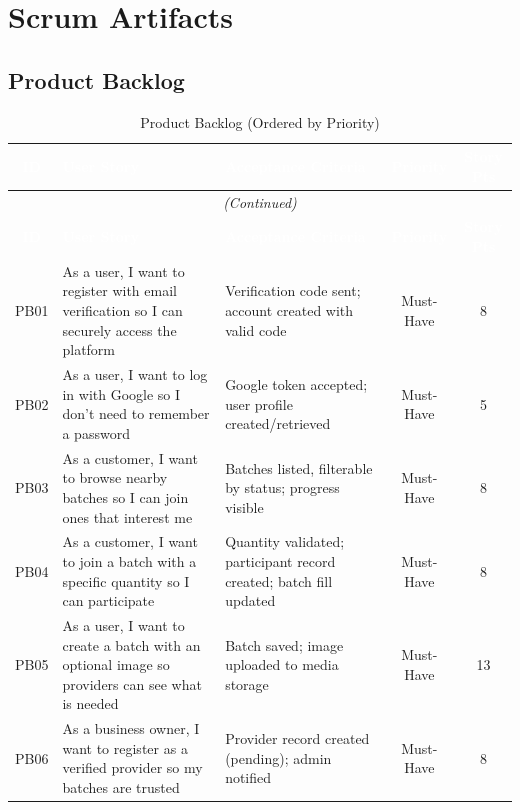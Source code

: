 \documentclass[12pt, a4paper]{report}
\begin{document}
\section{Scrum Artifacts}

\subsection{Product Backlog}

\begin{longtable}{c p{4cm} p{5.5cm} c c}
\caption{Product Backlog (Ordered by Priority)}\label{tab:product-backlog}\\
\toprule
\rowcolor{tablehead}
\textcolor{white}{\textbf{ID}} &
\textcolor{white}{\textbf{User Story}} &
\textcolor{white}{\textbf{Acceptance Criteria}} &
\textcolor{white}{\textbf{Priority}} &
\textcolor{white}{\textbf{Story Pts}}\\
\midrule
\endfirsthead
\multicolumn{5}{c}{\small\itshape (Continued)}\\
\toprule
\rowcolor{tablehead}
\textcolor{white}{\textbf{ID}} &
\textcolor{white}{\textbf{User Story}} &
\textcolor{white}{\textbf{Acceptance Criteria}} &
\textcolor{white}{\textbf{Priority}} &
\textcolor{white}{\textbf{Story Pts}}\\
\midrule
\endhead
\bottomrule
\endfoot
PB01 & As a user, I want to register with email verification so I can securely access the platform & Verification code sent; account created with valid code & Must-Have & 8\\
\rowcolor{batchitLight}
PB02 & As a user, I want to log in with Google so I don't need to remember a password & Google token accepted; user profile created/retrieved & Must-Have & 5\\
PB03 & As a customer, I want to browse nearby batches so I can join ones that interest me & Batches listed, filterable by status; progress visible & Must-Have & 8\\
\rowcolor{batchitLight}
PB04 & As a customer, I want to join a batch with a specific quantity so I can participate & Quantity validated; participant record created; batch fill updated & Must-Have & 8\\
PB05 & As a user, I want to create a batch with an optional image so providers can see what is needed & Batch saved; image uploaded to media storage & Must-Have & 13\\
\rowcolor{batchitLight}
PB06 & As a business owner, I want to register as a verified provider so my batches are trusted & Provider record created (pending); admin notified & Must-Have & 8\\

\end{longtable}
\end{document}
